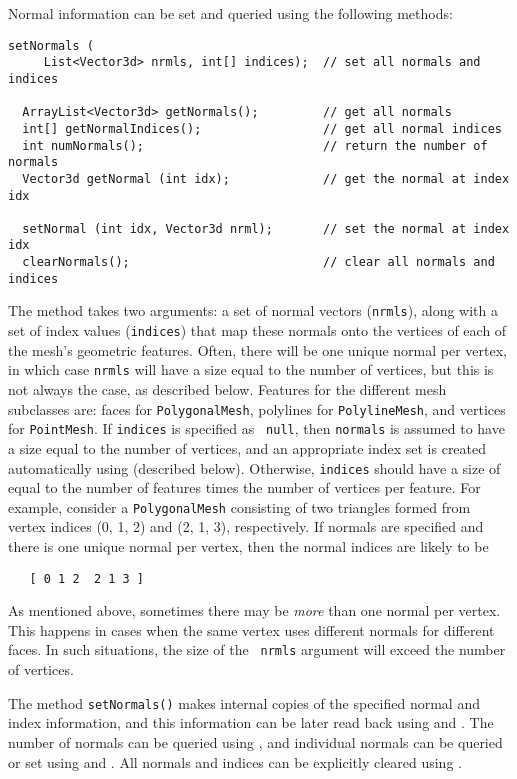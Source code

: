 Normal information can be set and queried using
the following methods:
%
\begin{lstlisting}[]
  setNormals (
     List<Vector3d> nrmls, int[] indices);  // set all normals and indices

  ArrayList<Vector3d> getNormals();         // get all normals
  int[] getNormalIndices();                 // get all normal indices
  int numNormals();                         // return the number of normals
  Vector3d getNormal (int idx);             // get the normal at index idx

  setNormal (int idx, Vector3d nrml);       // set the normal at index idx
  clearNormals();                           // clear all normals and indices
\end{lstlisting}
%
The method  takes
two arguments: a set of normal vectors ({\tt nrmls}), along with a set
of index values ({\tt indices}) that map these normals onto the
vertices of each of the mesh's geometric features. Often, there will
be one unique normal per vertex, in which case {\tt nrmls} will have a
size equal to the number of vertices, but this is not always the case,
as described below.  Features for the different mesh subclasses are:
faces for {\tt PolygonalMesh}, polylines for {\tt PolylineMesh}, and
vertices for {\tt PointMesh}.  If {\tt indices} is specified as {\tt
null}, then {\tt normals} is assumed to have a size equal to the
number of vertices, and an appropriate index set is created
automatically using
(described below). Otherwise, {\tt indices} should have a size of
equal to the number of features times the number of vertices per
feature. For example, consider a {\tt PolygonalMesh} consisting of two
triangles formed from vertex indices (0, 1, 2) and (2, 1, 3),
respectively. If normals are specified and there is one unique normal
per vertex, then the normal indices are likely to be
%
\begin{verbatim}
   [ 0 1 2  2 1 3 ]
\end{verbatim}
%
As mentioned above, sometimes there may be {\it more} than one normal
per vertex. This happens in cases when the same vertex uses different
normals for different faces. In such situations, the size of the {\tt
nrmls} argument will exceed the number of vertices.

The method {\tt setNormals()} makes internal copies of the specified
normal and index information, and this information can be
later read back using 
and
.
The number of normals can be queried using
,
and individual normals can be queried or set using
and
.
All normals and indices can be explicitly cleared using 
.

